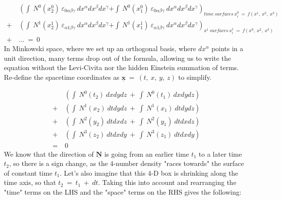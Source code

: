 \begin{equation}
  \begin{aligned}
    &\left (\int\ N^0\left (x^0_2\right )\ \varepsilon_{0\alpha\beta\gamma}\ dx^{\alpha}dx^{\beta}dx^{\gamma} \right.
    \left. + \int\ N^0\left (x^0_1\right )\ \varepsilon_{0\alpha\beta\gamma}\ dx^{\alpha}dx^{\beta}dx^{\gamma} \right)_{
    \mathit{time\ surfaces}\ x^0_i\ =\ f\left (x^1,\ x^2,\ x^3\right)}\\
    +\
    &\left (\int\ N^1\left (x^1_2\right )\ \varepsilon_{\alpha1\beta\gamma}\ dx^{\alpha}dx^{\beta}dx^{\gamma} \right.
    \left. + \int\ N^1\left (x^1_1\right )\ \varepsilon_{\alpha1\beta\gamma}\ dx^{\alpha}dx^{\beta}dx^{\gamma} \right)_{
    \mathit{x^1\ surfaces}\ x^1_i\ =\ f\left (x^0,\ x^2,\ x^3\right)}\\
    +\ &...\ =\ 0
  \end{aligned}
\end{equation}
In Minkowski space, where we set up an orthogonal basis, where $dx^{\alpha}$ points in a unit direction, many terms drop out of the formula, allowing us to write the equation without the Levi-Civita nor the hidden Einstein summation of terms.  Re-define the spacetime coordinates as $\underline{\mathbf{x}}\ =\ (t,\ x,\ y,\ z)$ to simplify.

\begin{equation}
  \begin{aligned}
    &\left (\int\ N^0\left (t_2\right )\  dxdydz\ +\ \int\ N^0\left (t_1\right )\  dxdydz\right)\\
    +\ &\left (\int\ N^1\left (x_2\right )\  dtdydz\ +\ \int\ N^1\left (x_1\right )\  dtdydz\right)\\
    +\ &\left (\int\ N^2\left (y_2\right )\  dtdxdz\ +\ \int\ N^2\left (y_1\right )\  dtdxdz\right)\\
    +\ &\left (\int\ N^3\left (z_2\right )\  dtdxdy\ +\ \int\ N^3\left (z_1\right )\  dtdxdy\right)\\
    =\ &0
  \end{aligned}
\end{equation}
We know that the direction of $\underline{\mathbf{N}}$ is going from an earlier time $t_1$ to a later time $t_2$, so there is a sign change, as the 4-number density "races towards" the surface of constant time $t_1$.  Let's also imagine that this 4-D box is shrinking along the time axis, so that $t_2\ =\ t_1\ +\ dt$.  Taking this into account and rearranging the "time" terms on the LHS and the "space" terms on the RHS gives the following:

